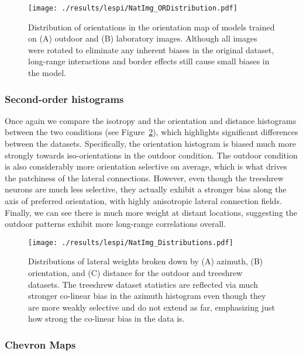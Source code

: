\begin{figure}
	\centering
    \texttt{[image: ./results/lespi/NatImg\_ORDistribution.pdf]}
	\caption[Distribution of orientations in the orientation map of
      models trained on outdoor and laboratory images.]{Distribution
      of orientations in the orientation map of models trained on (A)
      outdoor and (B) laboratory images. Although all images were
      rotated to eliminate any inherent biases in the original
      dataset, long-range interactions and border effects still cause
      small biases in the model.}
	\label{NatImgORs}
\end{figure}

\subsubsection*{Second-order histograms}

Once again we compare the isotropy and the orientation and distance
histograms between the two conditions (see
Figure~\ref{NatImgDistributions}), which highlights significant
differences between the datasets. Specifically, the orientation
histogram is biased much more strongly towards iso-orientations in the
outdoor condition. The outdoor condition is also considerably more
orientation selective on average, which is what drives the patchiness
of the lateral connections. However, even though the treeshrew neurons
are much less selective, they actually exhibit a stronger bias along
the axis of preferred orientation, with highly anisotropic lateral
connection fields. Finally, we can see there is much more weight at
distant locations, suggesting the outdoor patterns exhibit more
long-range correlations overall.

\begin{figure}
	\centering
        \texttt{[image: ./results/lespi/NatImg\_Distributions.pdf]}
	\caption[Distributions of lateral weights broken down by azimuth,
      orientation, and distance.]{Distributions of lateral weights
      broken down by (A) azimuth, (B) orientation, and (C) distance
      for the outdoor and treeshrew datasets. The treeshrew dataset
      statistics are reflected via much stronger co-linear bias in the
      azimuth histogram even though they are more weakly selective and
      do not extend as far, emphasizing just how strong the co-linear
      bias in the data is.}
	\label{NatImgDistributions}
\end{figure}

\subsubsection*{Chevron Maps}

